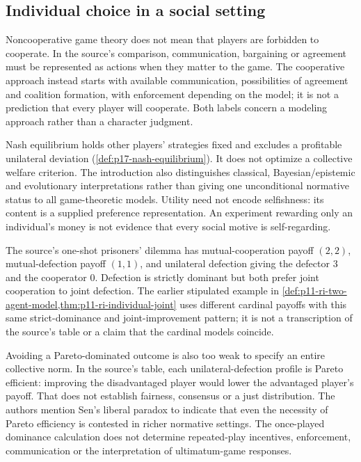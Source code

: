 \subsection{Individual choice in a social setting}

Noncooperative game theory does not mean that players are forbidden
to cooperate. In the source's comparison, communication, bargaining
or agreement must be represented as actions when they matter to the
game. The cooperative approach instead starts with available
communication, possibilities of agreement and coalition formation,
with enforcement depending on the model; it is not a prediction that
every player will cooperate. Both labels concern a modeling approach rather
than a character judgment.

Nash equilibrium holds other players' strategies fixed and excludes
a profitable unilateral deviation
(\cref{def:p17-nash-equilibrium}). It does not optimize a collective
welfare criterion. The introduction also distinguishes classical,
Bayesian/epistemic and evolutionary interpretations rather than giving
one unconditional normative status to all game-theoretic models.
Utility need not encode selfishness: its content is a supplied
preference representation. An experiment rewarding only an individual's
money is not evidence that every social motive is self-regarding.

The source's one-shot prisoners' dilemma has mutual-cooperation payoff
\((2,2)\), mutual-defection payoff \((1,1)\), and unilateral
defection giving the defector 3 and the cooperator 0. Defection is
strictly dominant but both prefer joint cooperation to joint defection.
The earlier stipulated example in
\cref{def:p11-ri-two-agent-model,thm:p11-ri-individual-joint}
uses different cardinal payoffs with this same strict-dominance and
joint-improvement pattern; it is not a transcription of the source's
table or a claim that the cardinal models coincide.

Avoiding a Pareto-dominated outcome is also too weak to specify an
entire collective norm. In the source's table, each unilateral-defection
profile is Pareto efficient: improving the disadvantaged player would
lower the advantaged player's payoff. That does not establish fairness,
consensus or a just distribution. The authors mention Sen's liberal
paradox to indicate that even the necessity of Pareto efficiency is
contested in richer normative settings. The once-played dominance
calculation does not determine repeated-play incentives, enforcement,
communication or the interpretation of ultimatum-game responses.

